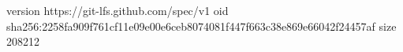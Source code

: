 version https://git-lfs.github.com/spec/v1
oid sha256:2258fa909f761cf11e09e00e6ceb8074081f447f663c38e869e66042f24457af
size 208212
